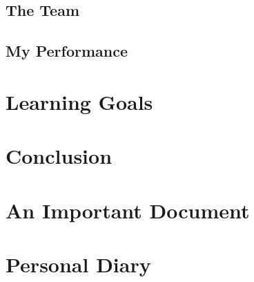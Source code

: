 \documentclass{article}
\begin{document}
  	\subsection{The Team}
  		\blindtext
  	\subsection{My Performance}
  		\blindtext
  	\section{Learning Goals}
  		\blindtext
  	\section{Conclusion}
		\blindtext
		
	\newpage
		
	\begin{appendices}
		\section{An Important Document}
			\blindtext
		\section{Personal Diary}
			\blindtext
	\end{appendices}
\end{document}
